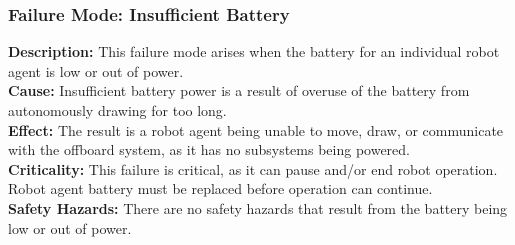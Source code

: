 \subsubsection{Failure Mode: Insufficient Battery}
\label{sec:power_fm_battery}
\textbf{Description:} This failure mode arises when the battery for an individual robot agent is low or out of power.\\
\textbf{Cause:} Insufficient battery power is a result of overuse of the battery from autonomously drawing for too long.\\
\textbf{Effect:} The result is a robot agent being unable to move, draw, or communicate with the offboard system, as it has no subsystems being powered.\\
\textbf{Criticality:} This failure is critical, as it can pause and/or end robot operation. Robot agent battery must be replaced before operation can continue.\\
\textbf{Safety Hazards:} There are no safety hazards that result from the battery being low or out of power.\\